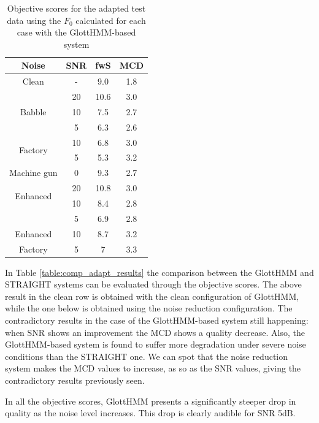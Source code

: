 \begin{table}[!htb]
\begin{center}
\begin{tabular}{c c | c | c}
Noise & SNR & fwS & MCD\\
\midrule
\midrule
Clean & - & 9.0 & 1.8\\
\midrule
\multirow{3}{*}{Babble} & 20 & 10.6 & 3.0\\
 & 10 & 7.5 & 2.7\\
 & 5 & 6.3 & 2.6\\
\midrule
\multirow{2}{*}{Factory} & 10 & 6.8 & 3.0\\
 & 5 & 5.3 & 3.2\\
\midrule
Machine gun & 0 & 9.3 & 2.7\\
\midrule
\midrule
\multirow{2}{*}{Enhanced} & 20 & 10.8 & 3.0\\
\multirow{2}{*}{Babble} & 10 & 8.4 & 2.8\\
& 5 & 6.9 & 2.8\\
\midrule
Enhanced & 10 & 8.7 & 3.2\\
Factory & 5 & 7 & 3.3\\
\bottomrule
\end{tabular}
\caption{Objective scores for the adapted test data using the $F_{0}$ calculated for each case with the GlottHMM-based system}
\label{table:results_no_ext_f0_glott}
\end{center}
\end{table}

In Table \ref{table:comp_adapt_results} the comparison between the GlottHMM and STRAIGHT systems can be evaluated through the objective scores.
%
The above result in the clean row is obtained with the clean configuration of GlottHMM, while the one below is obtained using the noise reduction configuration.
%
The contradictory results in the case of the GlottHMM-based system still happening: when SNR shows an improvement the MCD shows a quality decrease.
%
Also, the GlottHMM-based system is found to suffer more degradation under severe noise conditions than the STRAIGHT one.
%
We can spot that the noise reduction system makes the MCD values to increase, as so as the SNR values, giving the contradictory results previously seen.

In all the objective scores, GlottHMM presents a significantly steeper drop in quality as the noise level increases.
%
This drop is clearly audible for SNR 5dB. 

